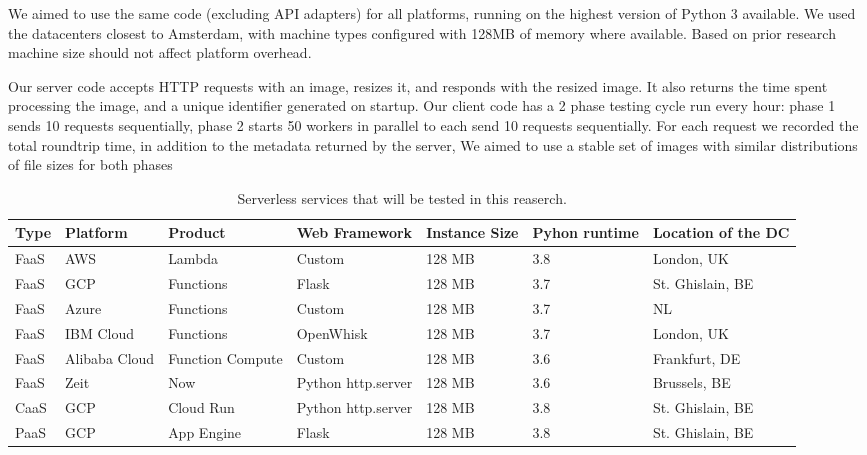 \documentclass[11pt]{article}
\begin{document}
We aimed to use the same code (excluding API adapters) for all platforms,
running on the highest version of Python 3 available.
We used the datacenters closest to Amsterdam,
with machine types configured with 128MB of memory where available.
Based on prior research %
machine size should not affect platform overhead.

Our server code accepts HTTP requests with an image,
resizes it, and responds with the resized image.
It also returns the time spent processing the image,
and a unique identifier generated on startup.
Our client code has a 2 phase testing cycle run every hour:
phase 1 sends 10 requests sequentially,
phase 2 starts 50 workers in parallel to each send 10 requests sequentially.
For each request we recorded the total roundtrip time,
in addition to the metadata returned by the server,
We aimed to use a stable set of images with similar distributions
of file sizes for both phases


\begin{table}
\begin{adjustwidth}{-0.9cm}{}
 \begin{tabularx}{1.1\textwidth}{p{1cm} X X X X X p{3cm}}
 \textbf{Type} & \textbf{Platform} & \textbf{Product} & \textbf{Web Framework} & \textbf{Instance Size} & \textbf{Pyhon runtime} & \textbf{Location of the DC} \\
 \hline
 \hline
 FaaS & AWS & Lambda & Custom & 128 MB & 3.8 & London, UK \\
 \hline
 FaaS & GCP & Functions & Flask & 128 MB & 3.7 & St. Ghislain, BE \\
 \hline
 FaaS & Azure & Functions & Custom & 128 MB & 3.7 & NL \\
 \hline
 FaaS & IBM Cloud & Functions & OpenWhisk & 128 MB & 3.7 & London, UK\\
 \hline
 FaaS & Alibaba Cloud & Function Compute & Custom & 128 MB & 3.6 & Frankfurt, DE\\
 \hline
 FaaS & Zeit & Now & Python http.server  & 128 MB & 3.6 & Brussels, BE\\
 \hline
 CaaS & GCP & Cloud Run & Python http.server & 128 MB & 3.8 & St. Ghislain, BE\\
 \hline
 PaaS & GCP & App Engine & Flask & 128 MB & 3.8 & St. Ghislain, BE\\
 \hline

\end{tabularx}
\caption{Serverless services that will be tested in this reaserch.}
\label{Tab:services}
\end{adjustwidth}
\end{table}
\end{document}
